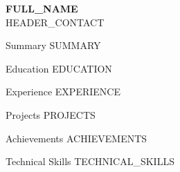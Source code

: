\documentclass{resume}
\begin{document}
\begin{center}
    {\textbf{\Huge {{FULL_NAME}}}} \\
    \vspace{1pt}
    \small
    {{HEADER_CONTACT}}
\end{center}

\begin{rSection}{Summary}
{{SUMMARY}}
\end{rSection}

\begin{rSection}{Education}
{{EDUCATION}}
\end{rSection}

\begin{rSection}{Experience}
{{EXPERIENCE}}
\end{rSection}

\begin{rSection}{Projects}
{{PROJECTS}}
\end{rSection}

\begin{rSection}{Achievements}
{{ACHIEVEMENTS}}
\end{rSection}

\begin{rSection}{Technical Skills}
{{TECHNICAL_SKILLS}}
\end{rSection}
\end{document}
